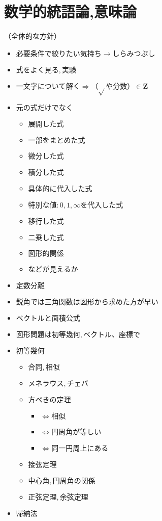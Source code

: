 \documentclass[dvipdfmx,uplatex]{jsarticle}
\begin{document}
\section{数学的統語論,意味論}
（全体的な方針）
\begin{itemize}
	\item $必要条件で絞りたい気持ち→しらみつぶし$
	\item $式をよく見る,実験$
	\item $一文字について解く\Rightarrow（\sqrt{}や分数）\in \bm{Z}$
	\item $元の式だけでなく$
	\begin{itemize}
		\item $展開した式$
		\item $一部をまとめた式$
		\item $微分した式$
		\item $積分した式$
		\item $具体的に代入した式$
		\item $特別な値:0,1, \infty を代入した式$
		\item $移行した式$
		\item $二乗した式$
		\item $図形的関係$
		\item $などが見えるか$
	\end{itemize}
	\item $定数分離$
	\item $鋭角では三角関数は図形から求めた方が早い$
	\item $ベクトルと面積公式$
	\item $図形問題は初等幾何,ベクトル、座標で$
	\item $初等幾何$
	\begin{itemize}
		\item $合同,相似$
		\item $メネラウス,チェバ$
		\item $方べきの定理$
		\begin{itemize}
			\item $ \Leftrightarrow 相似$
			\item $ \Leftrightarrow 円周角が等しい$
			\item $ \Leftrightarrow 同一円周上にある$
		\end{itemize}
		\item $接弦定理$
		\item $中心角,円周角の関係$
		\item $正弦定理,余弦定理$
	\end{itemize}
	\item $帰納法$
\end{itemize}
\end{document}
